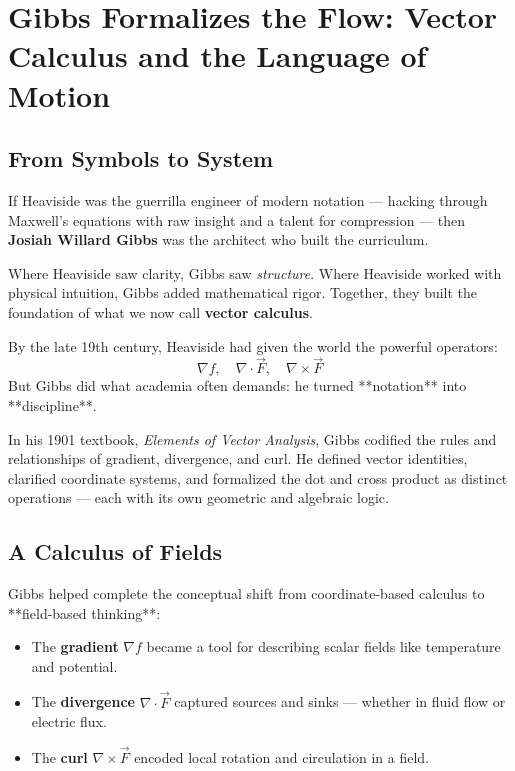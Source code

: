 \section{Gibbs Formalizes the Flow: Vector Calculus and the Language of Motion}

\subsection{From Symbols to System}

If Heaviside was the guerrilla engineer of modern notation — hacking through Maxwell’s equations with raw insight and a talent for compression — then \textbf{Josiah Willard Gibbs} was the architect who built the curriculum.

Where Heaviside saw clarity, Gibbs saw \emph{structure}.  
Where Heaviside worked with physical intuition, Gibbs added mathematical rigor.  
Together, they built the foundation of what we now call \textbf{vector calculus}.

By the late 19th century, Heaviside had given the world the powerful operators:
\[
\nabla f, \quad \nabla \cdot \vec{F}, \quad \nabla \times \vec{F}
\]
But Gibbs did what academia often demands:  
he turned **notation** into **discipline**.

In his 1901 textbook, \emph{Elements of Vector Analysis}, Gibbs codified the rules and relationships of gradient, divergence, and curl. He defined vector identities, clarified coordinate systems, and formalized the dot and cross product as distinct operations — each with its own geometric and algebraic logic.

\subsection{A Calculus of Fields}

Gibbs helped complete the conceptual shift from coordinate-based calculus to **field-based thinking**:

\begin{itemize}
    \item The \textbf{gradient} \( \nabla f \) became a tool for describing scalar fields like temperature and potential.
    \item The \textbf{divergence} \( \nabla \cdot \vec{F} \) captured sources and sinks — whether in fluid flow or electric flux.
    \item The \textbf{curl} \( \nabla \times \vec{F} \) encoded local rotation and circulation in a field.
\end{itemize}

